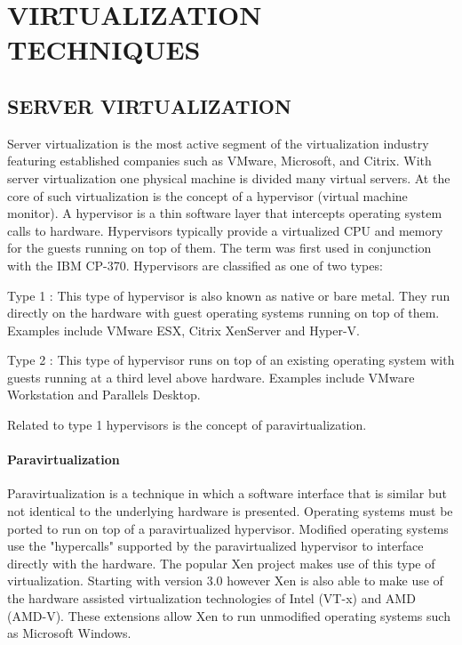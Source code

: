 \section{VIRTUALIZATION TECHNIQUES}

\subsection{SERVER VIRTUALIZATION}

Server virtualization is the most active segment of the virtualization industry featuring established companies such as VMware, Microsoft, and Citrix. With server virtualization one physical machine is divided many virtual servers. At the core of such virtualization is the concept of a hypervisor (virtual machine monitor). A hypervisor is a thin software layer that intercepts operating system calls to hardware. Hypervisors typically provide a virtualized CPU and memory for the guests running on top of them. The term was first used in conjunction with the IBM CP-370. Hypervisors are classified as one of two types:

Type 1 : This type of hypervisor is also known as native or bare metal. They run directly on the hardware with guest operating systems running on top of them. Examples include VMware ESX, Citrix XenServer and Hyper-V.

Type 2 : This type of hypervisor runs on top of an existing operating system with guests running at a third level above hardware. Examples include VMware Workstation and Parallels Desktop.

Related to type 1 hypervisors is the concept of paravirtualization.

\paragraph{Paravirtualization}

Paravirtualization is a technique in which a software interface that is similar but not identical to the underlying hardware is presented. Operating systems must be ported to run on top of a paravirtualized hypervisor. Modified operating systems use the "hypercalls" supported by the paravirtualized hypervisor to interface directly with the hardware. The popular Xen project makes use of this type of virtualization. Starting with version 3.0 however Xen is also able to make use of the hardware assisted virtualization technologies of Intel (VT-x) and AMD (AMD-V). These extensions allow Xen to run unmodified operating systems such as Microsoft Windows.

